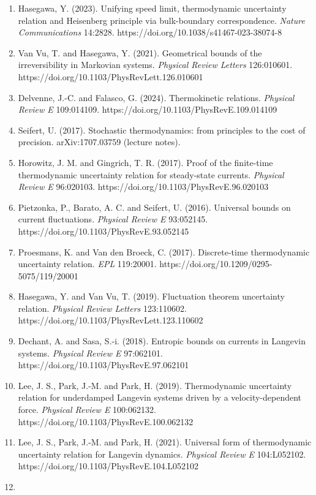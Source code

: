 \documentclass[
  10pt,
]{article}
\begin{document}
\begin{enumerate}
\item
  Hasegawa, Y. (2023). Unifying speed limit, thermodynamic uncertainty
  relation and Heisenberg principle via bulk-boundary correspondence.
  \emph{Nature Communications} 14:2828.
  https://doi.org/10.1038/s41467-023-38074-8
\item
  Van Vu, T. and Hasegawa, Y. (2021). Geometrical bounds of the
  irreversibility in Markovian systems. \emph{Physical Review Letters}
  126:010601. https://doi.org/10.1103/PhysRevLett.126.010601
\item
  Delvenne, J.-C. and Falasco, G. (2024). Thermokinetic relations.
  \emph{Physical Review E} 109:014109.
  https://doi.org/10.1103/PhysRevE.109.014109
\item
  Seifert, U. (2017). Stochastic thermodynamics: from principles to the
  cost of precision. arXiv:1707.03759 (lecture notes).
\item
  Horowitz, J. M. and Gingrich, T. R. (2017). Proof of the finite-time
  thermodynamic uncertainty relation for steady-state currents.
  \emph{Physical Review E} 96:020103.
  https://doi.org/10.1103/PhysRevE.96.020103
\item
  Pietzonka, P., Barato, A. C. and Seifert, U. (2016). Universal bounds
  on current fluctuations. \emph{Physical Review E} 93:052145.
  https://doi.org/10.1103/PhysRevE.93.052145
\item
  Proesmans, K. and Van den Broeck, C. (2017). Discrete-time
  thermodynamic uncertainty relation. \emph{EPL} 119:20001.
  https://doi.org/10.1209/0295-5075/119/20001
\item
  Hasegawa, Y. and Van Vu, T. (2019). Fluctuation theorem uncertainty
  relation. \emph{Physical Review Letters} 123:110602.
  https://doi.org/10.1103/PhysRevLett.123.110602
\item
  Dechant, A. and Sasa, S.-i. (2018). Entropic bounds on currents in
  Langevin systems. \emph{Physical Review E} 97:062101.
  https://doi.org/10.1103/PhysRevE.97.062101
\item
  Lee, J. S., Park, J.-M. and Park, H. (2019). Thermodynamic uncertainty
  relation for underdamped Langevin systems driven by a
  velocity-dependent force. \emph{Physical Review E} 100:062132.
  https://doi.org/10.1103/PhysRevE.100.062132
\item
  Lee, J. S., Park, J.-M. and Park, H. (2021). Universal form of
  thermodynamic uncertainty relation for Langevin dynamics.
  \emph{Physical Review E} 104:L052102.
  https://doi.org/10.1103/PhysRevE.104.L052102
\item

\end{enumerate}
\end{document}
